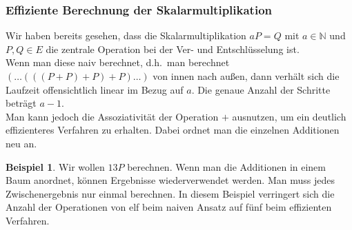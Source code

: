 \documentclass[hidelinks]{article}
\theoremstyle{plain}
\theoremstyle{definition}
\newtheorem{bsp}[thm]{Beispiel}
\theoremstyle{rem}
\begin{document}
\begin{sloppypar}
\subsubsection{Effiziente Berechnung der Skalarmultiplikation}
Wir haben bereits gesehen, dass die Skalarmultiplikation $aP = Q$ mit $a \in \mathbb{N}$ und $P, Q \in E$ die zentrale Operation bei der Ver- und Entschlüsselung ist. \\
Wenn man diese naiv berechnet, d.h.\ man berechnet $(\dots (((P + P) + P) + P) \dots )$ von innen nach außen, dann verhält sich die Laufzeit offensichtlich linear im Bezug auf $a$. Die genaue Anzahl der Schritte beträgt $a-1$. \\
Man kann jedoch die Assoziativität der Operation $+$ ausnutzen, um ein deutlich effizienteres Verfahren zu erhalten. Dabei ordnet man die einzelnen Additionen neu an.
\begin{bsp}
    Wir wollen $13P$ berechnen.
    Wenn man die Additionen in einem Baum anordnet, können Ergebnisse wiederverwendet werden. Man muss jedes Zwischenergebnis nur einmal berechnen. In diesem Beispiel verringert sich die Anzahl der Operationen von elf beim naiven Ansatz auf fünf beim effizienten Verfahren.
    \begin{figure}[H]
        \centering
\end{figure}
\end{bsp}
\end{sloppypar}
\end{document}

